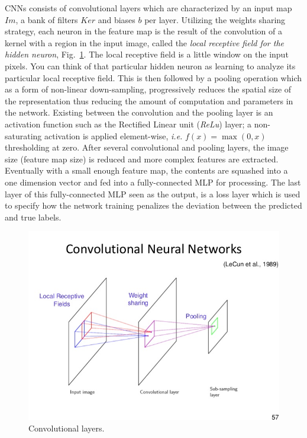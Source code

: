 \documentclass[final, paper=letter,5p,times,twocolumn]{elsarticle}
\begin{document}
CNNs consists of convolutional layers which are characterized by an input map $Im$, a bank of filters $Ker$ and biases $b$ per layer. Utilizing the weights sharing strategy, each neuron in the feature map is the result of the convolution of a kernel with a region in the input image, called the {\it local receptive field for the hidden neuron}, Fig.~\ref{fig:Convolutional_layers}. The local receptive field is a little window on the input pixels. You can think of that particular hidden neuron as learning to analyze its particular local receptive field. This is then followed by a pooling operation which as a form of non-linear down-sampling, progressively reduces the spatial size of the representation thus reducing the amount of computation and parameters in the network. Existing between the convolution and the pooling layer is an activation function such as the Rectified Linear unit ({\it ReLu}) layer; a non-saturating activation is applied element-wise, {\it i.e.} $f(x) = \max(0,x)$ thresholding at zero. After several convolutional and pooling layers, the image size (feature map size) is reduced and more complex features are extracted. \\
Eventually with a small enough feature map, the contents are squashed into a one dimension vector and fed into a fully-connected MLP for processing. The last layer of this fully-connected MLP seen as the output, is a loss layer which is used to specify how the network training penalizes the deviation between the predicted and true labels.


\begin{figure}[htbp]
   \begin{center}
      \includegraphics[scale=0.3, angle=0]{images/Bishop_cnn_layer.jpg}
   \end{center}
   \caption{Convolutional layers.}
  \label{fig:Convolutional_layers} 
\end{figure}
\end{document}
